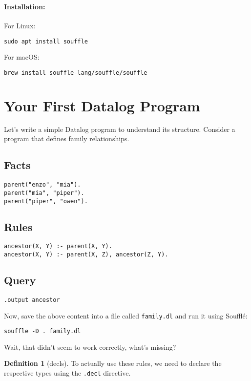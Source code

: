 \documentclass{article}
\theoremstyle{definition}
\newtheorem{definition}[theorem]{Definition}
\begin{document}
\textbf{Installation:}
\\
\\
For Linux:
\begin{verbatim}
sudo apt install souffle
\end{verbatim}

For macOS:
\begin{verbatim}
brew install souffle-lang/souffle/souffle
\end{verbatim}

\section{Your First Datalog Program}
Let's write a simple Datalog program to understand its structure. Consider a program that defines family relationships.

\subsection{Facts}
\begin{verbatim}
parent("enzo", "mia").
parent("mia", "piper").
parent("piper", "owen").
\end{verbatim}

\subsection{Rules}
\begin{verbatim}
ancestor(X, Y) :- parent(X, Y).
ancestor(X, Y) :- parent(X, Z), ancestor(Z, Y).
\end{verbatim}

\subsection{Query}
\begin{verbatim}
.output ancestor
\end{verbatim}

Now, save the above content into a file called \texttt{family.dl} and run it using Soufflé:
\begin{verbatim}
souffle -D . family.dl
\end{verbatim}

Wait, that didn't seem to work correctly, what's missing?
\begin{definition}[decls]
To actually use these rules, we need to declare the respective types using the \texttt{.decl} directive.
\end{definition}
\end{document}
